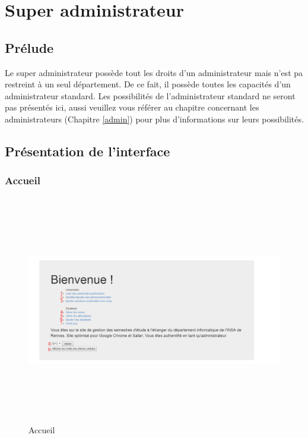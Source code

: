 \chapter{Super administrateur}

\section{Prélude}

Le super administrateur possède tout les droits d'un administrateur mais n'est pa restreint à un seul département. De ce fait, il possède toutes les capacités d'un administrateur standard. Les possibilités de l'administrateur standard ne seront pas présentés ici, aussi veuillez vous référer au chapitre concernant les administrateurs (Chapitre \ref{admin}) pour plus d'informations sur leurs possibilités. 

\section{Présentation de l'interface}

  \subsection{Accueil}
  \begin{figure}[H]
  	\centering
  	
  	\includegraphics[width=16cm,height=10cm]{Images/Super_Admin/menu_acceuil_super_admin}
  	\caption{Accueil}
  	\label{asa}
  \end{figure}
  
